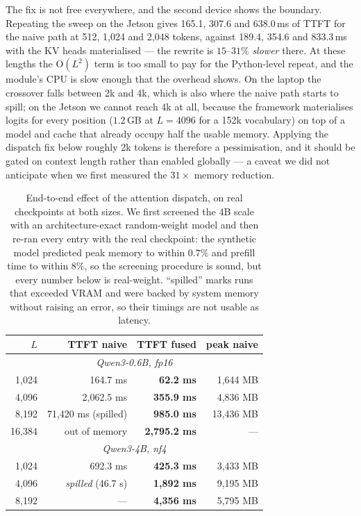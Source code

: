 \documentclass[10pt,journal]{IEEEtran}
\begin{document}
The fix is not free everywhere, and the second device shows the boundary.
Repeating the sweep on the Jetson gives 165.1, 307.6 and 638.0\,ms of TTFT for
the naive path at 512, 1{,}024 and 2{,}048 tokens, against 189.4, 354.6 and
833.3\,ms with the KV heads materialised --- the rewrite is $15$--$31\%$
\emph{slower} there. At these lengths the $\mathrm{O}(L^2)$ term is too small to
pay for the Python-level repeat, and the module's CPU is slow enough that the
overhead shows. On the laptop the crossover falls between 2k and 4k, which is
also where the naive path starts to spill; on the Jetson we cannot reach 4k at
all, because the framework materialises logits for every position ($1.2$\,GB at
$L{=}4096$ for a 152k vocabulary) on top of a model and cache that already
occupy half the usable memory. Applying the dispatch fix below roughly 2k tokens
is therefore a pessimisation, and it should be gated on context length rather
than enabled globally --- a caveat we did not anticipate when we first measured
the $31\times$ memory reduction.

\begin{table}[t]
\centering
\caption{End-to-end effect of the attention dispatch, on real checkpoints at both
sizes. We first screened the 4B scale with an architecture-exact random-weight
model and then re-ran every entry with the real checkpoint: the synthetic model
predicted peak memory to within $0.7\%$ and prefill time to within $8\%$, so the
screening procedure is sound, but every number below is real-weight.
``spilled'' marks runs that exceeded VRAM and were backed by system memory
without raising an error, so their timings are not usable as latency.}
\label{tab:stack}
\begin{tabular}{rrrr}
\toprule
$L$ & TTFT naive & TTFT fused & peak naive \\
\midrule
\multicolumn{4}{c}{\emph{Qwen3-0.6B, fp16}}\\
1{,}024 & 164.7 ms & \textbf{62.2 ms} & 1{,}644 MB \\
4{,}096 & 2{,}062.5 ms & \textbf{355.9 ms} & 4{,}836 MB \\
8{,}192 & 71{,}420 ms (spilled) & \textbf{985.0 ms} & 13{,}436 MB \\
16{,}384 & out of memory & \textbf{2{,}795.2 ms} & --- \\
\midrule
\multicolumn{4}{c}{\emph{Qwen3-4B, nf4}}\\
1{,}024 & 692.3 ms & \textbf{425.3 ms} & 3{,}433 MB \\
4{,}096 & \emph{spilled} (46.7 s) & \textbf{1{,}892 ms} & 9{,}195 MB \\
8{,}192 & --- & \textbf{4{,}356 ms} & 5{,}795 MB \\
\bottomrule
\end{tabular}
\end{table}
\end{document}
